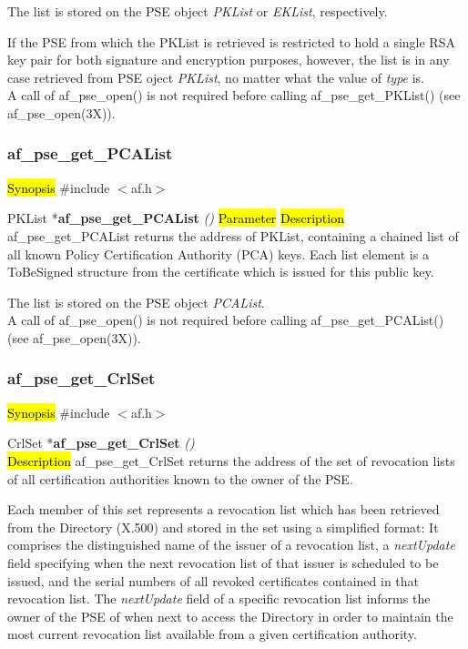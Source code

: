 The list is stored on the PSE object {\em PKList} or {\em EKList}, respectively.

If the PSE from which the PKList is retrieved is restricted to hold a single RSA key pair
for both signature and encryption purposes, however, the list is in any case retrieved from PSE oject {\em PKList},
no matter what the value of {\em type} is.
\\ [1em]
A call of af\_pse\_open() is not required before calling af\_pse\_get\_PKList()
(see af\_pse\_open(3X)).


\subsubsection{af\_pse\_get\_PCAList}
\label{af_pse_get_PCAList}
\hl{Synopsis}
\#include $<$af.h$>$

PKList *{\bf af\_pse\_get\_PCAList} {\em ()}
\hl{Parameter}
\hl{Description}
af\_pse\_get\_PCAList returns the address of PKList, containing a chained list of all known
Policy Certification Authority (PCA) keys.
Each list element is a ToBeSigned structure from the certificate which is issued for this public key.
 
The list is stored on the PSE object {\em PCAList}.
\\ [1em]
A call of af\_pse\_open() is not required before calling af\_pse\_get\_PCAList()
(see af\_pse\_open(3X)).


\subsubsection{af\_pse\_get\_CrlSet}
\label{af_get_CrlSet}
\hl{Synopsis}
\#include $<$af.h$>$

CrlSet *{\bf af\_pse\_get\_CrlSet} {\em ()} \\
\hl{Description}
af\_pse\_get\_CrlSet returns the address of the set of revocation lists of all
certification authorities known to the owner of the PSE.

Each member of this set represents a revocation list which has been retrieved from 
the Directory (X.500) and stored in the set using a simplified format: It comprises the distinguished
name of the issuer of a revocation list, a {\em nextUpdate} field specifying when the next
revocation list of that issuer is scheduled to be issued, and the serial numbers of all revoked
certificates contained in that revocation list. The {\em nextUpdate} field of a specific 
revocation list informs the owner of the PSE of when next to access the 
Directory in order to maintain the most current revocation list available from a given
certification authority. 

